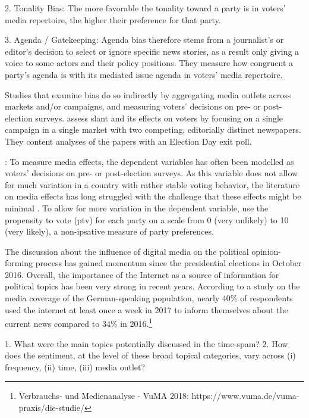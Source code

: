 \documentclass[12pt,a4paper,notitlepage]{article}
\begin{document}
2. Tonality Bias: The more favorable the tonality toward a party is in voters' media repertoire, the higher their preference for that party. 

3. Agenda / Gatekeeping: Agenda bias therefore stems from a journalist's or editor's decision to select or ignore specific news stories, as a result only giving a voice to some actors and their policy positions. They measure how congruent a party's agenda is with its mediated issue agenda in voters' media repertoire. 

Studies that examine bias do so indirectly by aggregating media outlets across markets and/or campaigns, and measuring voters' decisions on pre- or post-election surveys. \citet{druckman_impact_2005} assess slant and its effects on voters by focusing on a single campaign in a single market with two competing, editorially distinct newspapers. They content analyses of the papers with an Election Day exit poll. 

\citet{eberl_one_2017}: To measure media effects, the dependent variables has often been modelled as voters' decisions on pre- or post-election surveys. As this variable does not allow for much variation in a country with rather stable voting behavior, the literature on media effects has long struggled with the challenge that these effects might be minimal \citep{bennett_new_2008, holbert_new_2010}. To allow for more variation in the dependent variable, \citet{eberl_one_2017} use the propensity to vote (ptv) for each party on a scale from 0 (very unlikely) to 10 (very likely), a non-ipsative measure of party preferences.



The discussion about the influence of digital media on the political opinion-forming process has gained momentum since the presidential elections in October 2016. Overall, the importance of the Internet as a source of information for political topics has been very strong in recent years. According to a study on the media coverage of the German-speaking population, nearly 40\% of respondents used the internet at least once a week in 2017 to inform themselves about the current news compared to 34\% in 2016.\footnote{Verbrauchs- und Medienanalyse - VuMA 2018: https://www.vuma.de/vuma-praxis/die-studie/}

1. What were the main topics potentially discussed in the time-spam? 
2. How does the sentiment, at the level of these broad topical categories, vary across (i) frequency, (ii) time, (iii) media outlet?
\end{document}
